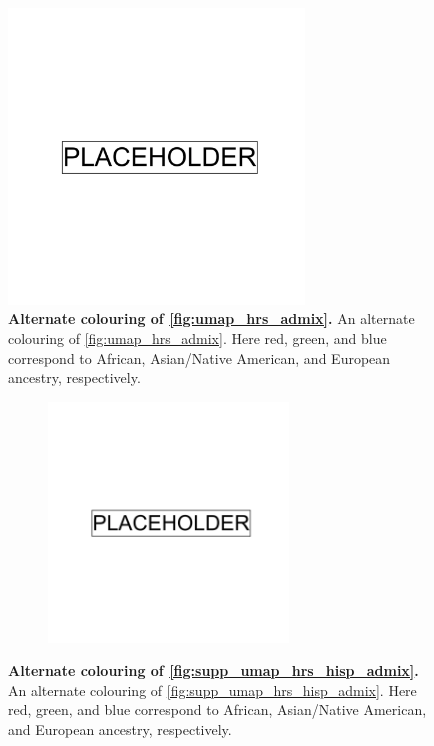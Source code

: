 \begin{figure}
\centering
    \includegraphics[width=0.7\textwidth]{placeholder.png}
   \caption[Alternate colouring of \ref{fig:umap_hrs_admix}]{\textbf{Alternate colouring of \ref{fig:umap_hrs_admix}.} An alternate colouring of \ref{fig:umap_hrs_admix}. Here red, green, and blue correspond to African, Asian/Native American, and European ancestry, respectively.}
    \label{fig:umap_hrs_admix_alt}
\end{figure}

\newpage

\begin{figure}
    \centering
    \begin{subfigure}{\textwidth}
    \includegraphics[width=0.7\textwidth]{placeholder.png}
    \end{subfigure}
    \caption[An alternate colouring of \ref{fig:supp_umap_hrs_hisp_admix}]{\textbf{Alternate colouring of \ref{fig:supp_umap_hrs_hisp_admix}.} An alternate colouring of \ref{fig:supp_umap_hrs_hisp_admix}. Here red, green, and blue correspond to African, Asian/Native American, and European ancestry, respectively.}
    \label{fig:supp_umap_hrs_hisp_admix_alt}
\end{figure}

